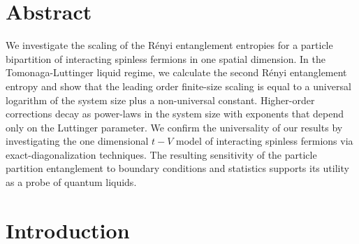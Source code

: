 \section{Abstract}
\author{Hatem Barghathi, Emanuel Casiano-Diaz and Adrian\\ {Del Maestro}}


We investigate the scaling of the R\'{e}nyi entanglement entropies for a
particle bipartition of interacting spinless fermions in one spatial dimension. In the Tomonaga-Luttinger liquid regime, we calculate the second R\'{e}nyi
entanglement entropy and show that the leading order finite-size scaling is
equal to a universal logarithm of the system size plus a non-universal
constant.  Higher-order corrections decay as power-laws in the system size
with exponents that depend only on the Luttinger parameter. We confirm the
universality of our results by investigating the one dimensional $t-V$ model of
interacting spinless fermions via exact-diagonalization techniques.  The
resulting sensitivity of the particle partition entanglement to boundary
conditions and statistics supports its utility as a probe of quantum liquids.


\section{Introduction}

